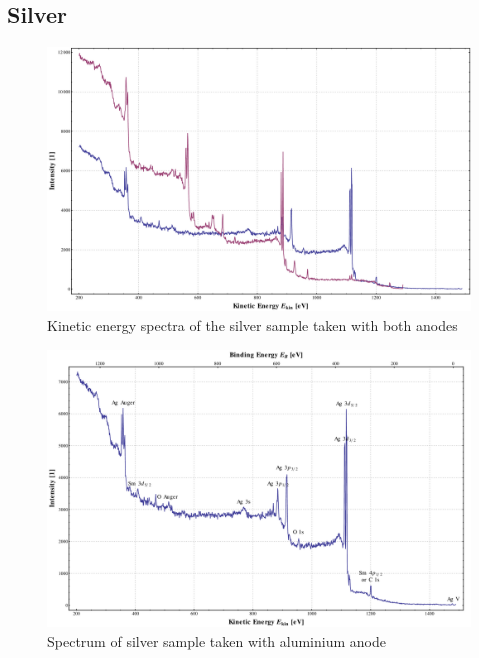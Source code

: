 \documentclass[a4paper,10pt]{scrartcl}
\begin{document}
\subsection{Silver}

\begin{figure}
\centering
\includegraphics[scale=0.3]{img/silver_kinetic_both}
\caption{Kinetic energy spectra of the silver sample taken with both anodes \label{fig:ag_kinetic}}
\end{figure}

\begin{figure}
\centering
\includegraphics[scale=0.3]{img/silver_binding_al}
\caption{Spectrum of silver sample taken with aluminium anode \label{fig:ag_al}}
\end{figure}
\end{document}
